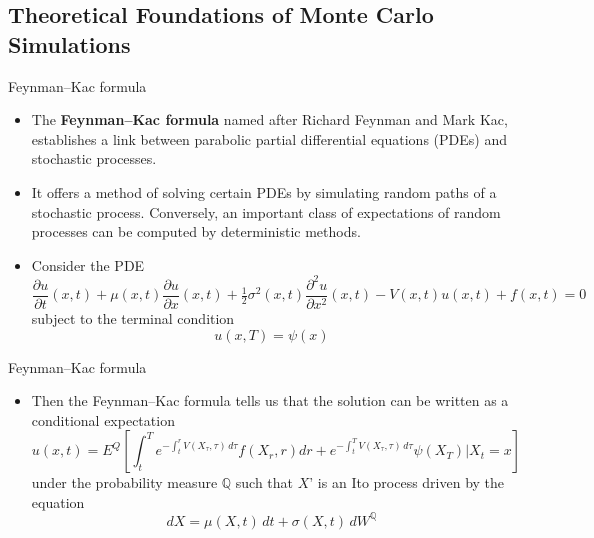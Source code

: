 \documentclass[11pt]{beamer}
\begin{document}
\subsection{Theoretical Foundations of Monte Carlo Simulations}
\begin{frame}{ Feynman–Kac formula}
\begin{itemize}
\item The \textbf{Feynman–Kac formula} named after Richard Feynman and Mark Kac, establishes a link between parabolic partial differential equations (PDEs) and stochastic processes. 
\item It offers a method of solving certain PDEs by simulating random paths of a stochastic process. Conversely, an important class of expectations of random processes can be computed by deterministic methods.  
\item Consider the PDE
\small
$$\frac{\partial u}{\partial t}(x,t) + \mu(x,t) \frac{\partial u}{\partial x}(x,t) + \tfrac{1}{2} \sigma^2(x,t) \frac{\partial^2 u}{\partial x^2}(x,t) -V(x,t) u(x,t) + f(x,t) = 0$$
\normalsize
subject to the terminal condition
$$
u(x,T)=\psi(x)
$$
\end{itemize}
\end{frame}
\begin{frame}{ Feynman–Kac formula}
\begin{itemize}
\item Then the Feynman–Kac formula tells us that the solution can be written as a conditional expectation
\footnotesize
$$
 u(x,t) = E^Q\left[ \int_t^T e^{-  \int_t^r V(X_\tau,\tau)\, d\tau}f(X_r,r)dr + e^{-\int_t^T V(X_\tau,\tau)\, d\tau}\psi(X_T) \Bigg| X_t=x \right]
 $$
 \normalsize
under the probability measure $\mathbb{Q}$ such that $X$' is an Ito process driven by the equation
$$
dX = \mu(X,t)\,dt + \sigma(X,t)\,dW^\mathbb{Q}
$$
\end{itemize}
\end{frame}
\end{document}
